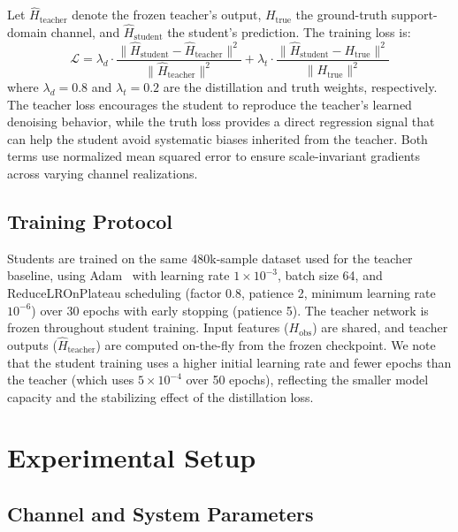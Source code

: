 \documentclass[conference]{IEEEtran}
\begin{document}
Let $\hat{H}_{\mathrm{teacher}}$ denote the frozen teacher's output, $H_{\mathrm{true}}$ the ground-truth support-domain channel, and $\hat{H}_{\mathrm{student}}$ the student's prediction. The training loss is:
\begin{equation}
    \mathcal{L} = \lambda_d \cdot \frac{\|\hat{H}_{\mathrm{student}} - \hat{H}_{\mathrm{teacher}}\|^2}{\|\hat{H}_{\mathrm{teacher}}\|^2} + \lambda_t \cdot \frac{\|\hat{H}_{\mathrm{student}} - H_{\mathrm{true}}\|^2}{\|H_{\mathrm{true}}\|^2}
    \label{eq:loss}
\end{equation}
where $\lambda_d = 0.8$ and $\lambda_t = 0.2$ are the distillation and truth weights, respectively. The teacher loss encourages the student to reproduce the teacher's learned denoising behavior, while the truth loss provides a direct regression signal that can help the student avoid systematic biases inherited from the teacher. Both terms use normalized mean squared error to ensure scale-invariant gradients across varying channel realizations.

\subsection{Training Protocol}

Students are trained on the same 480k-sample dataset used for the teacher baseline, using Adam~\cite{kingma2014adam} with learning rate $1 \times 10^{-3}$, batch size 64, and ReduceLROnPlateau scheduling (factor 0.8, patience 2, minimum learning rate $10^{-6}$) over 30 epochs with early stopping (patience 5). The teacher network is frozen throughout student training. Input features ($H_{\mathrm{obs}}$) are shared, and teacher outputs ($\hat{H}_{\mathrm{teacher}}$) are computed on-the-fly from the frozen checkpoint. We note that the student training uses a higher initial learning rate and fewer epochs than the teacher (which uses $5 \times 10^{-4}$ over 50 epochs), reflecting the smaller model capacity and the stabilizing effect of the distillation loss.

\section{Experimental Setup}
\label{sec:setup}

\subsection{Channel and System Parameters}
\end{document}
